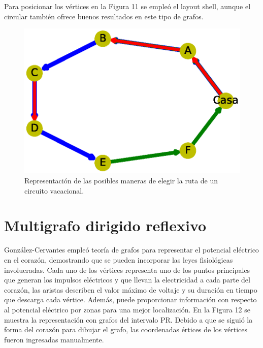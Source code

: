 \documentclass{article}
\begin{document}
Para posicionar los vértices en la Figura 11 se empleó el layout shell, aunque el circular también ofrece buenos resultados en este tipo de grafos.


\begin{figure}
  \includegraphics[width=.8\columnwidth]{fig11.eps}
  \caption{Representación de las posibles maneras de elegir la ruta de un circuito vacacional.}
  \label{Figura 11}
\end{figure}




\section{Multigrafo dirigido reflexivo}

González-Cervantes \cite{gonzalez2016potencial} empleó teoría de grafos para representar el potencial eléctrico en el corazón, demostrando que se pueden incorporar las leyes fisiológicas involucradas. Cada uno de los vértices representa uno de los puntos principales que generan los impulsos eléctricos y que llevan la electricidad a cada parte del corazón, las aristas describen el valor máximo de voltaje y su
duración en tiempo que descarga cada vértice. Además, puede proporcionar información con respecto al potencial eléctrico por zonas para una mejor localización.
En la Figura 12 se muestra la representación con grafos del intervalo PR. Debido a que se siguió la forma del corazón para dibujar el grafo, las coordenadas értices de los vértices fueron ingresadas manualmente.
\end{document}
